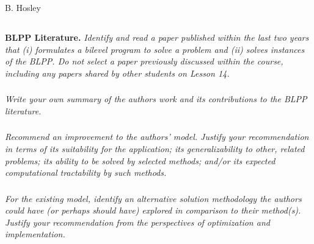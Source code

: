 \documentclass[12pt]{amsart}
\begin{document}
\raggedbottom

\hspace{\fill} {\large B. Hosley}
\bigskip


\setcounter{subsection}{0}
\subsection{}

\textbf{BLPP Literature.} 
\textit{Identify and read a paper published within the last two years that (i) formulates a bilevel program to solve a problem and (ii) solves instances of the BLPP. Do not select a paper previously discussed within the course, including any papers shared by other students on Lesson 14.}


\subsubsection{}
\textit{Write your own summary of the authors work and its contributions to the BLPP literature.}


\subsubsection{}
\textit{Recommend an improvement to the authors’ model. Justify your recommendation in terms of its suitability for the application; its generalizability to other, related problems; its ability to be solved by selected methods; and/or its expected computational tractability by such methods.}


\subsubsection{}
\textit{For the existing model, identify an alternative solution methodology the authors could have (or perhaps should have) explored in comparison to their method(s). Justify your recommendation from the perspectives of optimization and implementation.}
\end{document}
